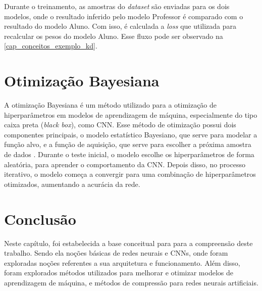 Durante o treinamento, as amostras do \textit{dataset} são enviadas para os dois modelos, onde o resultado inferido pelo
modelo Professor é comparado com o resultado do modelo Aluno.
Com isso, é calculada a \textit{loss} que utilizada para recalcular os pesos do modelo Aluno.
Esse fluxo pode ser observado na \autoref{cap_conceitos_exemplo_kd}.


%


\section{Otimização Bayesiana}\label{cap_conceitos_bayesiana}
A otimização Bayesiana é um método utilizado para a otimização de hiperparâmetros em modelos de aprendizagem de
máquina, especialmente do tipo caixa preta (\textit{black box}), como CNN.
Esse método de otimização possui dois componentes principais, o modelo estatístico Bayesiano, que serve para modelar a
função alvo, e a função de aquisição, que serve para escolher a próxima amostra de dados \cite{frazier2018tutorial}.
Durante o teste inicial, o modelo escolhe os hiperparâmetros de forma aleatória, para aprender o comportamento da CNN.
Depois disso, no processo iterativo, o modelo começa a convergir para uma combinação de hiperparâmetros otimizados,
aumentando a acurácia da rede.



\section{Conclusão}
Neste capítulo, foi estabelecida a base conceitual para para a compreensão deste trabalho.
Sendo ela noções básicas de redes neurais e CNNs, onde foram exploradas noções referentes a sua arquitetura e funcionamento.
Além disso, foram explorados métodos utilizados para melhorar e otimizar modelos de aprendizagem de máquina, e métodos de
compressão para redes neurais artificiais.
